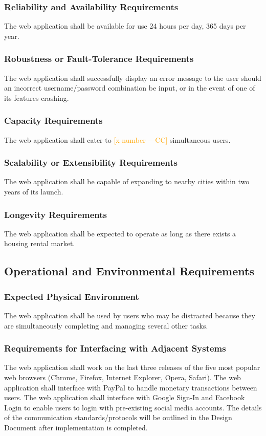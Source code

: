 \documentclass[12pt, titlepage]{article}
\newcommand{\authornote}[3]{\textcolor{#1}{[#3 ---#2]}}
\newcommand{\authornote}[3]{}
\newcommand{\cc}[1]{\authornote{orange}{CC}{#1}}
\begin{document}
{\subsubsection{Reliability and Availability Requirements}
The web application shall be available for use 24 hours per day, 365 days per year.
\subsubsection{Robustness or Fault-Tolerance Requirements}
The web application shall successfully display an error message to the user should an incorrect username/password combination be input, or in the event of one of its features crashing.  
\subsubsection{Capacity Requirements}
The web application shall cater to \cc{x number} simultaneous users. 
\subsubsection{Scalability or Extensibility Requirements}
The web application shall be capable of expanding to nearby cities within two years of its launch.
\subsubsection{Longevity Requirements}
The web application shall be expected to operate as long as there exists a housing rental market.
\subsection{Operational and Environmental Requirements}
\subsubsection{Expected Physical Environment}
The web application shall be used by users who may be distracted because they are simultaneously completing and managing several other tasks. 
\subsubsection{Requirements for Interfacing with Adjacent Systems}
The web application shall work on the last three releases of the five most popular web browsers (Chrome, Firefox, Internet Explorer, Opera, Safari). The web application shall interface with PayPal to handle monetary transactions between users. The web application shall interface with Google Sign-In and Facebook Login to enable users to login with pre-existing social media accounts. The details of the communication standards/protocols will be outlined in the Design Document after implementation is completed.
}
\end{document}
